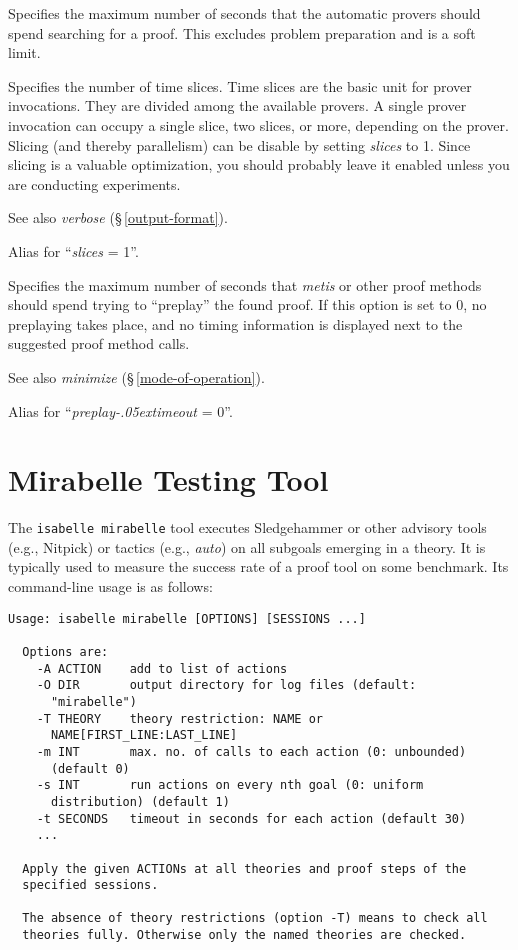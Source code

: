 \documentclass[a4paper,12pt]{article}
\let\oldS=\S
\def\S{\oldS\,}
\renewcommand\_{\hbox{\textunderscore\kern-.05ex}}
\begin{document}
\begin{enum}
Specifies the maximum number of seconds that the automatic provers should spend
searching for a proof. This excludes problem preparation and is a soft limit.

Specifies the number of time slices. Time slices are the basic unit for prover
invocations. They are divided among the available provers. A single prover
invocation can occupy a single slice, two slices, or more, depending on the
prover. Slicing (and thereby parallelism) can be disable by setting
\textit{slices} to 1. Since slicing is a valuable optimization, you should
probably leave it enabled unless you are conducting experiments.

\nopagebreak
{\small See also \textit{verbose} (\S\ref{output-format}).}

\optrueonly{dont\_slice}
Alias for ``\textit{slices} = 1''.

\opdefault{preplay\_timeout}{float}{\upshape 1}
Specifies the maximum number of seconds that \textit{metis} or other proof
methods should spend trying to ``preplay'' the found proof. If this option
is set to 0, no preplaying takes place, and no timing information is displayed
next to the suggested proof method calls.

\nopagebreak
{\small See also \textit{minimize} (\S\ref{mode-of-operation}).}

\optrueonly{dont\_preplay}
Alias for ``\textit{preplay\_timeout} = 0''.

\end{enum}

\section{Mirabelle Testing Tool}
\label{mirabelle}

The \texttt{isabelle mirabelle} tool executes Sledgehammer or other advisory
tools (e.g., Nitpick) or tactics (e.g., \textit{auto}) on all subgoals emerging
in a theory. It is typically used to measure the success rate of a proof tool
on some benchmark. Its command-line usage is as follows:

{\small
\begin{verbatim}
Usage: isabelle mirabelle [OPTIONS] [SESSIONS ...]

  Options are:
    -A ACTION    add to list of actions
    -O DIR       output directory for log files (default:
      "mirabelle")
    -T THEORY    theory restriction: NAME or
      NAME[FIRST_LINE:LAST_LINE]
    -m INT       max. no. of calls to each action (0: unbounded)
      (default 0)
    -s INT       run actions on every nth goal (0: uniform
      distribution) (default 1)
    -t SECONDS   timeout in seconds for each action (default 30)
    ...

  Apply the given ACTIONs at all theories and proof steps of the
  specified sessions.

  The absence of theory restrictions (option -T) means to check all
  theories fully. Otherwise only the named theories are checked.
\end{verbatim}
}
\end{document}
